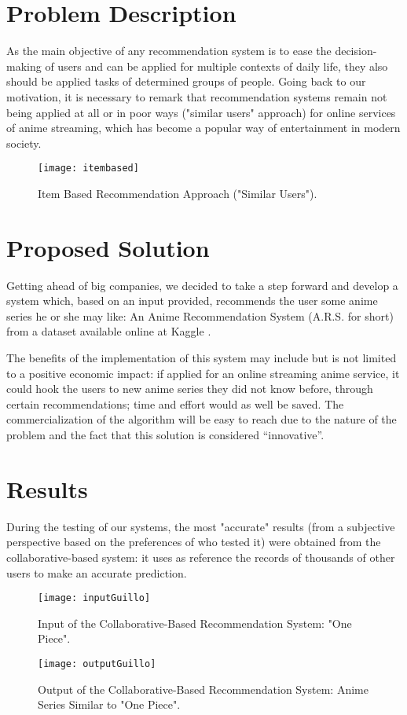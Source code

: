 \documentclass[conference]{IEEEtran}
\begin{document}
\section{Problem Description}

As the main objective of any recommendation system is to ease the decision-making of users and can be applied for multiple contexts of daily life, they also should be applied tasks of determined groups of people. Going back to our motivation, it is necessary to remark that recommendation systems remain not being applied at all or in poor ways ("similar users" approach) for online services of anime streaming, which has become a popular way of entertainment in modern society.

\begin{figure}[H]
	\centering
	\texttt{[image: itembased]}
	\caption{Item Based Recommendation Approach ("Similar Users").}
	\label{3}
\end{figure}


\section{Proposed Solution}

Getting ahead of big companies, we decided to take a step forward and develop a system which, based on an input provided, recommends the user some anime series he or she may like: An Anime Recommendation System (A.R.S. for short) from a dataset available online at Kaggle \cite{b7}.

The benefits of the implementation of this system may include but is not limited to a positive economic impact: if applied for an online streaming anime service, it could hook the users to new anime series they did not know before, through certain recommendations; time and effort would as well be saved. The commercialization of the algorithm will be easy to reach due to the nature of the problem and the fact that this solution is considered “innovative”.

\section{Results}

During the testing of our systems, the most "accurate" results (from a subjective perspective based on the preferences of who tested it) were obtained from the collaborative-based system: it uses as reference the records of thousands of other users to make an accurate prediction.
\begin{figure}[H]
	\centering
	\texttt{[image: inputGuillo]}
	\caption{Input of the Collaborative-Based Recommendation System: "One Piece".}
	\label{5}
\end{figure}
\begin{figure}[H]
	\centering
	\texttt{[image: outputGuillo]}
	\caption{Output of the Collaborative-Based Recommendation System: Anime Series Similar to "One Piece".}
	\label{6}
\end{figure}
\end{document}
